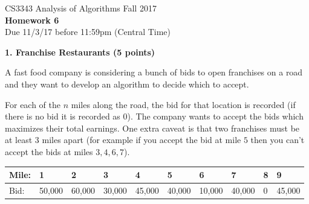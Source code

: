 \documentclass[12pt]{elsart}
\begin{document}
\pagestyle{empty}

\begin{center}
\Large  CS3343 Analysis of Algorithms Fall 2017 \\
\large {\bf Homework 6}\\
\normalsize Due 11/3/17 before 11:59pm (Central Time)
\end{center}

{\bf 1.  Franchise Restaurants (5 points)}

A fast food company is considering a bunch of bids to open franchises on a road and they want to develop an algorithm to decide which to accept.

For each of the $n$ miles along the road, the bid for that location is recorded (if there is no bid it is recorded as $0$).  The company wants to accept the bids which maximizes their total earnings.  One extra caveat is that two franchises must be at least $3$ miles apart (for example if you accept the bid at mile $5$ then you can't accept the bids at miles $3,4,6,7$).

\hspace*{0.5cm}  \begin{tabular}{ |l|l|l|l|l|l|l|l|l|l| }
  \hline
   Mile: & 1 & 2 & 3 & 4 & 5 & 6 & 7 & 8 & 9 \\
  \hline
  Bid: &   50,000 & 60,000 & 30,000 & 45,000 & 40,000 & 10,000 & 40,000 & 0 & 45,000 \\
  \hline
\end{tabular}
\end{document}

